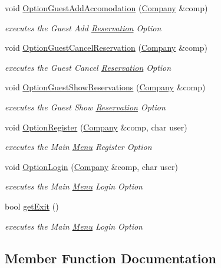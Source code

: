 \begin{DoxyCompactItemize}
void \hyperlink{class_menu_a1c7245c03f9932161ef7dc2361a9c55a}{Option\+Guest\+Add\+Accomodation} (\hyperlink{class_company}{Company} \&comp)
\begin{DoxyCompactList}\small\item\em executes the Guest Add \hyperlink{class_reservation}{Reservation} Option \end{DoxyCompactList}\item 
void \hyperlink{class_menu_ae3bbaa56e9712e3cf4e9616ee903ce87}{Option\+Guest\+Cancel\+Reservation} (\hyperlink{class_company}{Company} \&comp)
\begin{DoxyCompactList}\small\item\em executes the Guest Cancel \hyperlink{class_reservation}{Reservation} Option \end{DoxyCompactList}\item 
void \hyperlink{class_menu_ac3538faa6021838efa1d113357a4d057}{Option\+Guest\+Show\+Reservations} (\hyperlink{class_company}{Company} \&comp)
\begin{DoxyCompactList}\small\item\em executes the Guest Show \hyperlink{class_reservation}{Reservation} Option \end{DoxyCompactList}\item 
void \hyperlink{class_menu_a61d2097ab47f782141c5357c8eb6b8d1}{Option\+Register} (\hyperlink{class_company}{Company} \&comp, char user)
\begin{DoxyCompactList}\small\item\em executes the Main \hyperlink{class_menu}{Menu} Register Option \end{DoxyCompactList}\item 
void \hyperlink{class_menu_adfdae8763c7eae8698af5dd02c8d65c5}{Option\+Login} (\hyperlink{class_company}{Company} \&comp, char user)
\begin{DoxyCompactList}\small\item\em executes the Main \hyperlink{class_menu}{Menu} Login Option \end{DoxyCompactList}\item 
bool \hyperlink{class_menu_a0667d42e9888ba144d20b83a0855310d}{get\+Exit} ()
\begin{DoxyCompactList}\small\item\em executes the Main \hyperlink{class_menu}{Menu} Login Option \end{DoxyCompactList}\end{DoxyCompactItemize}


\subsection{Member Function Documentation}
\hypertarget{class_menu_a8df6166e3d285587a8a0f827adac2963}{}\label{class_menu_a8df6166e3d285587a8a0f827adac2963} 
